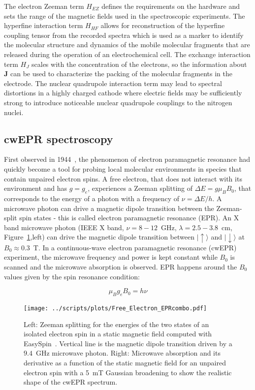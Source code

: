 The electron Zeeman term $H_{EZ}$ defines the requirements on the hardware and sets the range of the magnetic fields used in the spectroscopic experiments. The hyperfine interaction term $H_{HF}$ allows for reconstruction of the hyperfine coupling tensor from the recorded spectra which is used as a marker to identify the molecular structure and dynamics of the mobile molecular fragments that are released during the operation of an electrochemical cell. The exchange interaction term $H_{J}$ scales with the concentration of the electrons, so the information about $\textbf{J}$ can be used to characterize the packing of the molecular fragments in the electrode. The nuclear quadrupole interaction term may lead to spectral distortions in a highly charged cathode where electric fields may be sufficiently strong to introduce noticeable nuclear quadrupole couplings to the nitrogen nuclei.


\subsection{cwEPR spectroscopy}
\label{subs:cwEPR_spectroscopy}
First observed in 1944~\cite{Zavoisky_1945_JP,zavoisky_1945,salikhov_2015}, the phenomenon of electron paramagnetic resonance had quickly become a tool for probing local molecular environments in species that contain unpaired electron spins. A free electron, that does not interact with its environment and has $g=g_e$, experiences a Zeeman splitting of $\Delta E = g \mu_B B_0$, that corresponds to the energy of a photon with a frequency of $\nu=\Delta E / h$. A microwave photon can drive a magnetic dipole transition between the Zeeman-split spin states - this is called electron paramagnetic resonance (EPR). An X band microwave photon (IEEE X band, $\nu=8-12$~GHz, $\lambda=2.5-3.8$~cm, Figure~\ref{fig:cwerp_free_electron},left) can drive the magnetic dipole transition between $\vert{\uparrow\rangle}$ and $\vert{\downarrow\rangle}$ at $B_0\approx0.3$~T. In a continuous-wave electron paramagnetic resonance (cwEPR) experiment, the microwave frequency and power is kept constant while $B_0$ is scanned and the microwave absorption is observed. EPR happens around the $B_0$ values given by the spin resonance condition:

\begin{equation}
\label{eq:epr_resonance_condition}
\mu_B g_e B_0 = h\nu
\end{equation}

\begin{figure}[h]
\center
	\texttt{[image: ../scripts/plots/Free\_Electron\_EPRcombo.pdf]}
	\caption{Left: Zeeman splitting for the energies of the two states of an isolated electron spin in a static magnetic field computed with EasySpin~\cite{Easyspin}. Vertical line is the magnetic dipole transition driven by a $9.4$~GHz microwave photon. Right: Microwave absorption and its derivative as a function of the static magnetic field for an unpaired electron spin with a 5~mT Gaussian broadening to show the realistic shape of the cwEPR spectrum.}
	\label{fig:cwerp_free_electron}
\end{figure}


